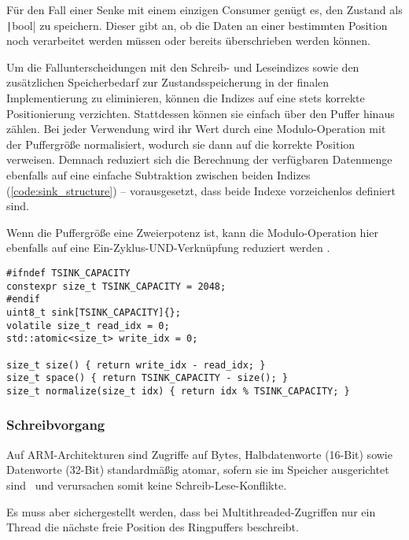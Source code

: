 Für den Fall einer Senke mit einem einzigen Consumer genügt es, den Zustand als
\texttt|bool| zu speichern. Dieser gibt an, ob die Daten an einer
bestimmten Position noch verarbeitet werden müssen oder bereits überschrieben
werden können.

Um die Fallunterscheidungen mit den Schreib- und Leseindizes sowie den
zusätzlichen Speicherbedarf zur Zustandsspeicherung in der finalen
Implementierung zu eliminieren, können die Indizes auf eine stets korrekte
Positionierung verzichten. Stattdessen können sie einfach über den Puffer hinaus
zählen. Bei jeder Verwendung wird ihr Wert durch eine Modulo-Operation mit der
Puffergröße normalisiert, wodurch sie dann auf die korrekte Position verweisen.
Demnach reduziert sich die Berechnung der verfügbaren Datenmenge ebenfalls auf
eine einfache Subtraktion zwischen beiden Indizes (\ref{code:sink_structure}) --
vorausgesetzt, dass beide Indexe vorzeichenlos definiert sind.

Wenn die Puffergröße eine Zweierpotenz ist, kann die Modulo-Operation hier
ebenfalls auf eine Ein-Zyklus-UND-Verknüpfung reduziert werden
\cite{stackoverflow_mod, arm_instruction_set}.

\begin{code}
\begin{verbatim}
#ifndef TSINK_CAPACITY
constexpr size_t TSINK_CAPACITY = 2048;
#endif
uint8_t sink[TSINK_CAPACITY]{};
volatile size_t read_idx = 0;
std::atomic<size_t> write_idx = 0;

size_t size() { return write_idx - read_idx; }
size_t space() { return TSINK_CAPACITY - size(); }
size_t normalize(size_t idx) { return idx % TSINK_CAPACITY; }
\end{verbatim}
    \label{code:sink_structure}
\end{code}

\subsubsection{Schreibvorgang}

Auf ARM-Architekturen sind Zugriffe auf Bytes, Halbdatenworte (16-Bit) sowie
Datenworte (32-Bit) standardmäßig atomar, sofern sie im Speicher ausgerichtet
sind~\cite[S. A3-79]{ARM_DDI0403_EE} und verursachen somit keine
Schreib-Lese-Konflikte.

Es muss aber sichergestellt werden, dass bei Multithreaded-Zugriffen nur ein
Thread die nächste freie Position des Ringpuffers beschreibt.

